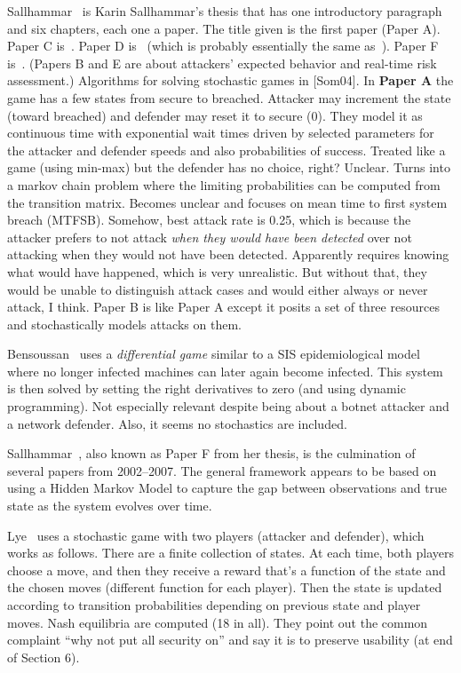 \documentclass{sig-alternate}
\begin{document}
Sallhammar~\cite{sallhammar2007using} is Karin Sallhammar's thesis
that has one introductory paragraph and six chapters, each one a
paper. The title given is the first paper (Paper A).  Paper C
is~\cite{sallhammar2005incorporating}. Paper D
is~\cite{sallhammar2006stochastic} (which is probably essentially the
same as~\cite{sallhammar2006towards}). Paper F
is~\cite{sallhammar2007framework}. (Papers B and E are about
attackers' expected behavior and real-time risk assessment.)
Algorithms for solving stochastic games in [Som04].  In {\bf Paper A} the
game has a few states from secure to breached.  Attacker may increment
the state (toward breached) and defender may reset it to secure (0).
They model it as continuous time with exponential wait times driven by
selected parameters for the attacker and defender speeds and also
probabilities of success.  Treated like a game (using min-max) but the
defender has no choice, right?  Unclear.  Turns into a markov chain
problem where the limiting probabilities can be computed from the
transition matrix.  Becomes unclear and focuses on mean time to first
system breach (MTFSB).  Somehow, best attack rate is 0.25, which is
because the attacker prefers to not attack {\em when they would have
  been detected} over not attacking when they would not have been
detected.  Apparently requires knowing what would have happened, which
is very unrealistic.  But without that, they would be unable to
distinguish attack cases and would either always or never attack, I
think.  Paper B is like Paper A except it posits a set of three
resources and stochastically models attacks on them.

Bensoussan~\cite{bensoussan2010game} uses a {\em differential game}
similar to a SIS epidemiological model where no longer infected
machines can later again become infected. This system is then solved
by setting the right derivatives to zero (and using dynamic
programming). Not especially relevant despite being about a botnet
attacker and a network defender. Also, it seems no stochastics are
included.

Sallhammar~\cite{sallhammar2007framework}, also known as Paper F from
her thesis, is the culmination of several papers from 2002--2007. The
general framework appears to be based on using a Hidden Markov Model
to capture the gap between observations and true state as the system
evolves over time.

Lye~\cite{lye2005game} uses a stochastic game with two players
(attacker and defender), which works as follows.  There are a finite
collection of states.  At each time, both players choose a move, and
then they receive a reward that's a function of the state and the
chosen moves (different function for each player). Then the state is
updated according to transition probabilities depending on previous
state and player moves. Nash equilibria are computed (18 in all).
They point out the common complaint ``why not put all security on''
and say it is to preserve usability (at end of Section 6).
\end{document}
